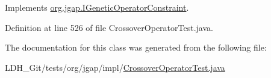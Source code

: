 Implements \hyperlink{interfaceorg_1_1jgap_1_1_i_genetic_operator_constraint_aad6e4b9c79f35e6e569e8d3c98876c50}{org.\-jgap.\-I\-Genetic\-Operator\-Constraint}.



Definition at line 526 of file Crossover\-Operator\-Test.\-java.



The documentation for this class was generated from the following file\-:\begin{DoxyCompactItemize}
\item 
L\-D\-H\-\_\-\-Git/tests/org/jgap/impl/\hyperlink{_crossover_operator_test_8java}{Crossover\-Operator\-Test.\-java}\end{DoxyCompactItemize}
